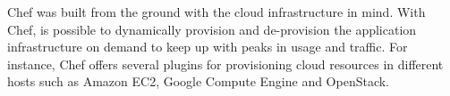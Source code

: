 Chef was built from the ground with the cloud infrastructure in mind. With Chef, is possible to dynamically
provision and de-provision the application infrastructure on demand to keep up with peaks in usage and traffic.
For instance, Chef offers several plugins for provisioning cloud resources in different hosts such as
Amazon EC2, Google Compute Engine and OpenStack.
